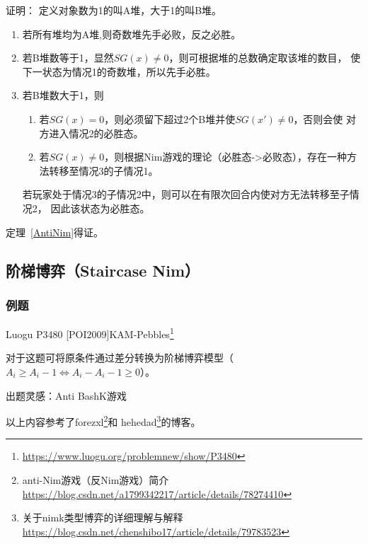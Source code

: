 证明：
定义对象数为1的叫A堆，大于1的叫B堆。

\begin{enumerate}
	\item 若所有堆均为A堆,则奇数堆先手必败，反之必胜。
	\item 若B堆数等于1，显然$SG(x)\not=0$，则可根据堆的总数确定取该堆的数目，
	      使下一状态为情况1的奇数堆，所以先手必胜。
	\item 若B堆数大于1，则
	      \begin{enumerate}
		      \item 若$SG(x)=0$，则必须留下超过2个B堆并使$SG(x')\not=0$，否则会使
		            对方进入情况2的必胜态。
		      \item 若$SG(x)\not=0$，则根据Nim游戏的理论（必胜态->必败态），存在一种方法转移至情况3的子情况1。
	      \end{enumerate}
	      若玩家处于情况3的子情况2中，则可以在有限次回合内使对方无法转移至子情况2，
	      因此该状态为必胜态。
\end{enumerate}

定理~\ref{AntiNim}得证。

\subsection{阶梯博弈（Staircase Nim）}


\subsubsection{例题}

Luogu P3480 [POI2009]KAM-Pebbles\footnote{\url{https://www.luogu.org/problemnew/show/P3480}}

对于这题可将原条件通过差分转换为阶梯博弈模型（$A_i \geq A_i-1 \Leftrightarrow
	A_i-A_i-1 \geq 0$）。



出题灵感：Anti BashK游戏

以上内容参考了forezxl\footnote{anti-Nim游戏（反Nim游戏）简介
	\url{https://blog.csdn.net/a1799342217/article/details/78274410}}和
hehedad\footnote{关于nimk类型博弈的详细理解与解释
	\url{https://blog.csdn.net/chenshibo17/article/details/79783523}}的博客。
